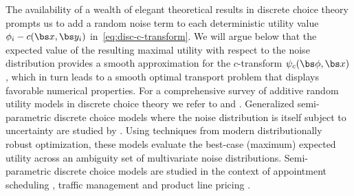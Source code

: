 \documentclass[11pt, a4paper, oneside, reqno]{article}
\begin{document}
	The availability of a wealth of elegant theoretical results in discrete choice theory prompts us to add a random noise term to each deterministic utility value $\phi_i - c(\bs x, \bs y_i)$ in~\eqref{eq:disc-c-transform}. We will argue below that the expected value of the resulting maximal utility with respect to the noise distribution provides a smooth approximation for the $c$-transform $\psi_c(\bs \phi, \bs x)$, which in turn leads to a smooth optimal transport problem that displays favorable numerical properties. For a comprehensive survey of additive random utility models in discrete choice theory we refer to \citet{dubin1984econometric} and \citet{daganzo2014multinomial}. Generalized semi-parametric discrete choice models where the noise distribution is itself subject to uncertainty are studied by \citet{natarajan2009persistency}. Using techniques from modern distributionally robust optimization, these models evaluate the best-case (maximum) expected utility across an ambiguity set of multivariate noise distributions. Semi-parametric discrete choice models are studied in the context of appointment scheduling \citep{mak2015appointment}, traffic management \citep{ahipacsaouglu2016flexibility} and product line pricing \citep{qi2019product}.
	
	
\end{document}
